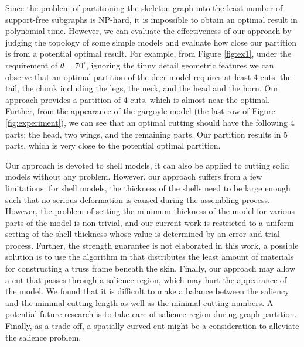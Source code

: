 Since the problem of partitioning the skeleton graph into the least number of support-free subgraphs is NP-hard, it is impossible to obtain an optimal result in polynomial time. However, we can evaluate the effectiveness of our approach by judging the topology of some simple models and evaluate how close our partition is from a potential optimal result. For example, from Figure \ref{fig:ex1}, under the requirement of $\theta = 70^{\circ}$, ignoring the tinny detail geometric features we can observe that an optimal partition of the deer model requires at least $4$ cuts: the tail, the chunk including the legs, the neck, and the head and the horn. Our approach provides a partition of 4 cuts, which is almost near the optimal. Further, from the appearance of the gargoyle model (the last row of Figure \ref{fig:experiment}), we can see that an optimal cutting should have the following 4 parts: the head, two wings, and the remaining parts. Our partition results in 5 parts, which is very close to the potential optimal partition.

Our approach is devoted to shell models, it can also be applied to cutting solid models without any problem. However, our approach suffers from a few limitations: for shell models, the thickness of the shells need to be large enough such that no serious deformation is caused during the assembling process. However, the problem of setting the minimum thickness of the model for various parts of the model is non-trivial, and our current work is restricted to a uniform setting of the shell thickness whose value is determined by an error-and-trial process. Further, the strength guarantee is not elaborated in this work, a possible solution is to use the algorithm in \cite{WangWYLTTDCL13} that distributes the least amount of materials for constructing a truss frame beneath the skin. Finally, our approach may allow a cut that passes through a salience region, which may hurt the appearance of the model. We found that it is difficult to make a balance between the saliency and the minimal cutting length as well as the minimal cutting numbers. A potential future research is to take care of salience region during graph partition. Finally, as a trade-off, a spatially curved cut might be a consideration to alleviate the salience problem.
